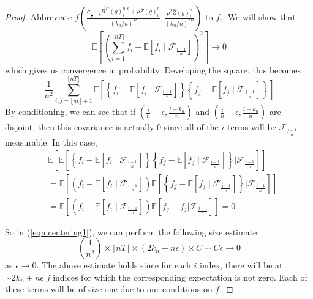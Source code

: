 \documentclass[12pt,letterpaper]{article}
\theoremstyle{definition}
\newcommand{\E}{\mathbb{E}}
\begin{document}
\begin{proof}
  Abbreviate \(f\left( \frac{\sigma_{\frac{i}{n}-\epsilon}\overline{B^H}(g)^{n,\epsilon}_i + \rho\overline{Z}(g)^n_i}{(k_n/n)^{H}}, \frac{\rho^2\widehat{Z}(g)^n_i}{(k_n/n)^{2H}}\right)\) to \(f_{i}\). We will show that
  \begin{equation}
    \E \left[ \left( \sum_{i =1}^{\lfloor nT \rfloor} f_i - \E \left[ f_i \mid \mathcal{F}_{\frac{i-1}{n}} \right] \right)^2 \right] \to 0
  \end{equation}
  which gives us convergence in probability. Developing the square, this becomes
  \begin{equation}
    \label{eqn:centering1}
    \frac{1}{n^2} \sum_{i, j = \lfloor n\epsilon\rfloor + 1}^{\lfloor nT \rfloor} \E \left[ \left\{ f_i - \E[ f_i \mid \mathcal{F}_{\frac{i - 1}{n}} ] \right\} \left\{f_j - \E[ f_j \mid \mathcal{F}_{\frac{j - 1}{n}} ] \right\} \right]
  \end{equation}
  By conditioning, we can see that if \(\left( \frac{i}{n} - \epsilon, \frac{i + k_{n}}{n} \right)\) and \(\left( \frac{i}{n} - \epsilon, \frac{i + k_{n}}{n} \right)\) are disjoint, then this covariance is actually 0 since all of the \(i\) terms will be \(\mathcal{F}_{\frac{j-1}{n}}\)-measurable. In this case,
  \begin{align}
  & \E \left[ \E \left[ \left\{ f_i - \E[ f_i \mid \mathcal{F}_{\frac{i - 1}{n}} ] \right\} \left\{f_j - \E[ f_j \mid \mathcal{F}_{\frac{j - 1}{n}} ] \right\} \bigr\vert \mathcal{F}_{\frac{j - 1}{n}} \right] \right] \\
  & = \E \left[ \left( f_i - \E[ f_i \mid \mathcal{F}_{\frac{i - 1}{n}} ] \right) \E \left[ \left\{f_j - \E[ f_j \mid \mathcal{F}_{\frac{j - 1}{n}} ] \right\} \bigr\vert \mathcal{F}_{\frac{j - 1}{n}} \right] \right] \\
  & = \E \left[ \left( f_i - \E[ f_i \mid \mathcal{F}_{\frac{i - 1}{n}} ] \right) \E \left[  f_j - f_j  \bigr\vert \mathcal{F}_{\frac{j - 1}{n}} \right] \right] = 0
  \end{align}

  So in (\ref{eqn:centering1}), we can perform the following size estimate:
  \begin{equation}
    \left(\frac{1}{n^2}\right) \times \lfloor nT \rfloor \times (2 k_n + n\epsilon) \times C \sim C\epsilon \rightarrow 0
  \end{equation}
  as \(\epsilon \rightarrow 0\). The above estimate holds since for each \(i\) index, there will be at \(\sim 2 k_n + n\epsilon\) \(j\) indices for which the corresponding expectation is not zero. Each of these terms will be of size one due to our conditions on \(f\).
\end{proof}
\end{document}
